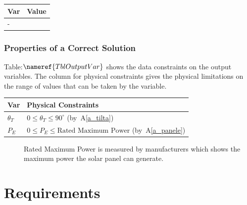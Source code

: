 \documentclass[12pt]{article}
\newcommand{\aref}[1]{A\ref{#1}}
\begin{document}
\begin{table}[!h]
\caption{Specification Parameter Values} \label{TblSpecParams}
\renewcommand{\arraystretch}{1.2}
\noindent \begin{longtable*}{l l} 
  \toprule
  \textbf{Var} & \textbf{Value} \\
  \midrule 
  $\text{-}$ & \text{-}\\
  \bottomrule
\end{longtable*}
\end{table}



\subsubsection{Properties of a Correct Solution} \label{sec_CorrectSolution}

\noindent
Table:$\nameref{TblOutputVar}$ shows the data constraints on the output variables. The column
for physical constraints gives the physical limitations on the range of values that can be
taken by the variable.

\begin{table}[!h]
\caption{Output Variables} \label{TblOutputVar}
\renewcommand{\arraystretch}{1.2}
\noindent \begin{longtable*}{l l} 
  \toprule
  \textbf{Var} & \textbf{Physical Constraints} \\
  \midrule 
  $\theta_{T}$ & $0 \leq \theta_{T} \leq 90^\circ$ (by~\aref{a_tilta})\\
  $P_E$ & $0 \leq P_E \leq \text{Rated Maximum Power}$ (by~\aref{a_panele})
  \\
  \bottomrule
\end{longtable*}
\end{table}

\begin{description}

\item[ ] Rated Maximum Power is measured by manufacturers which shows the 
maximum power the solar panel can generate.

\end{description}

\section{Requirements}

\end{document}
